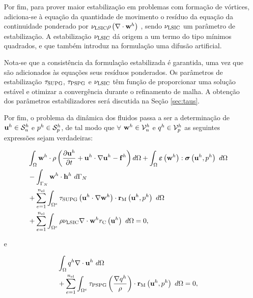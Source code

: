 \documentclass[tese_patricia]{subfiles}%
\begin{document}
Por fim, para prover maior estabilização em problemas com formação de vórtices, adiciona-se à equação da quantidade de movimento o resíduo da equação da continuidade ponderado por $ \nu_{\mathrm{LSIC}} \rho \left(\nabla \cdot \mathbf{w}^h\right)$ \cite{TezduyarO:2000}, sendo $\nu_{\mathrm{LSIC}}$ um parâmetro de estabilização. A estabilização  $\nu_{\mathrm{LSIC}}$ dá origem a um termo do tipo mínimos quadrados, e que também introduz na formulação uma difusão artificial.

Nota-se que a consistência da formulação estabilizada é garantida, uma vez que são adicionados às equações seus resíduos ponderados. Os parâmetros de estabilização $\tau_{\mathrm{SUPG}}$, $\tau_{\mathrm{PSPG}}$ e $\nu_{\mathrm{LSIC}}$ têm função de proporcionar uma solução estável e otimizar a convergência durante o refinamento de malha. A obtenção dos parâmetros estabilizadores será discutida na Seção \ref{sec:taus}. 

Por fim, o problema da dinâmica dos fluidos passa a ser a determinação de $\mathbf{u}^h \in \mathcal{S}_u^h$ e $p^h \in \mathcal{S}_p^h$, de tal modo que $\forall$ $\mathbf{w}^h \in \mathcal{V}_u^h$ e $q^h \in \mathcal{V}_p^h$ as seguintes expressões sejam verdadeiras:

\begin{align}
\begin{split}
&\int_{\Omega} \mathbf{w}^h \cdot \rho\left(\frac{\partial\mathbf{u}^h}{\partial t}+\mathbf{u}^h\cdot \nabla\mathbf{u}^h - \mathbf{f}^h\right) d\Omega +\int_{\Omega} \bm{\varepsilon} \left(\mathbf{w}^h\right) : \boldsymbol{\sigma} \left(\mathbf{u}^h,p^h\right)\ d\Omega\\ &
- \int_{\Gamma_N}\mathbf{w}^h \cdot \mathbf{h}^h\ d\Gamma_{N} \\ 
&+ \sum_{e=1}^{n_{\mathrm{el}}} \int_{\Omega^e} \tau_{\mathrm{SUPG}} \left(\mathbf{u}^h \cdot \nabla\mathbf{w}^h\right) \cdot \mathbf{r}_{\mathrm{M}}\left(\mathbf{u}^h,p^h \right)\  d\Omega\\
&+ \sum_{e=1}^{n_{\mathrm{el}}} \int_{\Omega^e} \rho \nu_{\mathrm{LSIC}} \nabla \cdot \mathbf{w}^h {r}_{\mathrm{C}}\left(\mathbf{u}^h\right)\  d\Omega = 0,
\label{eq:FinalSystem}
\end{split}
\end{align}

\noindent e

\begin{align}
	\begin{split}
	&\int_{\Omega}q^h \nabla \cdot \mathbf{u}^h \ d\Omega \\ 
	&+ \sum_{e=1}^{n_{\mathrm{el}}} \int_{\Omega^e} \tau_{\mathrm{PSPG}} \left(\frac{\nabla q^h}{\rho}\right) \cdot \mathbf{r}_{\mathrm{M}}\left(\mathbf{u}^h,p^h\right) \  d\Omega = 0,
	\label{eq:RC}
	\end{split}
	\end{align}
\end{document}
